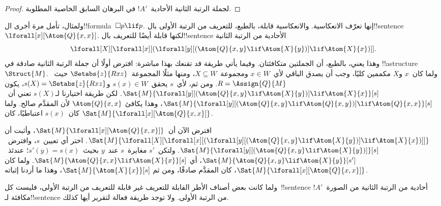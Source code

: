 \documentclass[../../../include/open-logic-section]{subfiles}
\begin{document}
\begin{proof}
  لجملة الرتبة الثانية الأحادية~$!A'$ في البرهان السابق الخاصية
  المطلوبة.
\end{proof}

ولمثال، تأمل مرة أخرى ال!!{formula}~$\Box p \lif p$. إنها تعرّف
الانعكاسية. والانعكاسية قابلة، بالطبع، للتعريف من الرتبة الأولى
بال!!{sentence}~$\lforall[x][\Atom{Q}{x,x}]$. لكنها قابلة أيضًا
للتعريف بال!!{sentence} الأحادية من الرتبة الثانية
\[
\lforall[X][\lforall[x][(\lforall[y][(\Atom{Q}{x,y} \lif \Atom{X}{y})]
    \lif \Atom{X}{x})]].
\]
وهذا يعني، بالطبع، أن الجملتين متكافئتان. وفيما يأتي طريقة قد تقنعك
بهذا مباشرة: افترض أولًا أن جملة الرتبة الثانية صادقة في
!!a{structure}~$\Struct{M}$. ولما كان~$x$ و$X$ مكممين كليًا، وجب أن
يصدق الباقي لأي~$x \in W$ ومجموعة~$X \subseteq W$، ومنها مثلًا
المجموعة~$\Setabs{z}{Rxz}$ حيث~$R = \Assign{Q}{M}$. ومن ثم، لأي~$s$
يحقق~$s(x) \in W$ و$s(X) = \Setabs{z}{Rxz}$، يكون
$\Sat{M}{\lforall[y][(\Atom{Q}{x,y} \lif
    \Atom{X}{y})] \lif \Atom{X}{x}}[s]$. لكن طريقة اختيارنا لـ$s(X)$
تعني أن~$\Sat{M}{\lforall[y][(\Atom{Q}{x,y} \lif
    \Atom{Q}{x,y})] \lif \Atom{Q}{x,x}}[s]$، وهذا يكافئ
$\Atom{Q}{x,x}$ لأن المقدَّم صالح. ولما كان~$s(x)$ اعتباطيًا، كان
$\Sat{M}{\lforall[x][\Atom{Q}{x,x}]}$.

افترض الآن أن~$\Sat{M}{\lforall[x][\Atom{Q}{x,x}]}$، وأثبت أن
$\Sat{M}{\lforall[X][\lforall[x][(\lforall[y][(\Atom{Q}{x,y} \lif
        \Atom{X}{y})] \lif \Atom{X}{x})]]}$. اختر أي تعيين~$s$،
وافترض~$\Sat{M}{\lforall[y][(\Atom{Q}{x,y} \lif
    \Atom{X}{y})]}[s]$. ولتكن~$s'$ مغايرة~$s$ عند~$y$ بحيث~$s'(y)
= s(x)$؛ عندئذ~$\Sat{M}{\Atom{Q}{x,y} \lif \Atom{X}{y}}[s']$، أي
$\Sat{M}{\Atom{Q}{x,x} \lif \Atom{X}{x}}[s]$. ولما كان
$\Sat{M}{\lforall[x][\Atom{Q}{x,x}]}$، كان المقدَّم صادقًا، ومن ثم
$\Sat{M}{\Atom{X}{x}}[s]$، وهذا ما أردنا إثباته.

ولما كانت بعض أصناف الأطر القابلة للتعريف غير قابلة للتعريف من
الرتبة الأولى، فليست كل~!!{sentence} أحادية من الرتبة الثانية من
الصورة~$!A'$ مكافئة لـ!!{sentence} من الرتبة الأولى. ولا توجد طريقة
فعالة لتقرير أيها كذلك.
\end{document}
